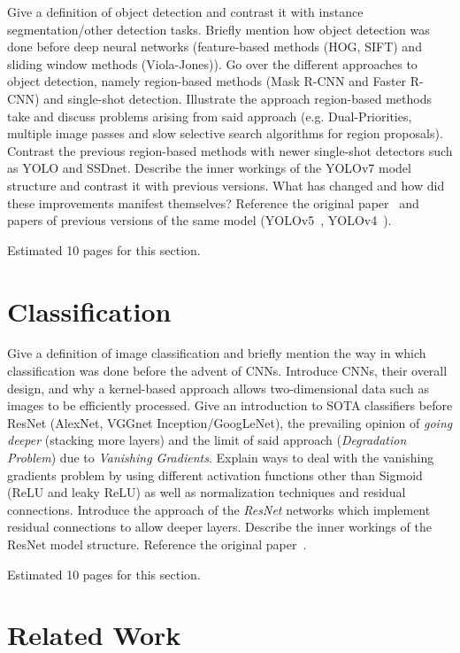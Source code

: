 \documentclass[draft,final]{vutinfth} %
\begin{document}
Give a definition of object detection and contrast it with instance
segmentation/other detection tasks. Briefly mention how object
detection was done before deep neural networks (feature-based methods
(HOG, SIFT) and sliding window methods (Viola-Jones)). Go over the
different approaches to object detection, namely region-based methods
(Mask R-CNN and Faster R-CNN) and single-shot detection. Illustrate
the approach region-based methods take and discuss problems arising
from said approach (e.g. Dual-Priorities, multiple image passes and
slow selective search algorithms for region proposals). Contrast the
previous region-based methods with newer single-shot detectors such as
YOLO and SSDnet. Describe the inner workings of the YOLOv7 model
structure and contrast it with previous versions. What has changed and
how did these improvements manifest themselves? Reference the original
paper~\cite{wang2022} and papers of previous versions of the same
model (YOLOv5~\cite{jocher2022}, YOLOv4~\cite{bochkovskiy2020}).

Estimated 10 pages for this section.

\section{Classification}
\label{sec:background-classification}

Give a definition of image classification and briefly mention the way
in which classification was done before the advent of CNNs. Introduce
CNNs, their overall design, and why a kernel-based approach allows
two-dimensional data such as images to be efficiently processed. Give
an introduction to SOTA classifiers before ResNet (AlexNet, VGGnet
Inception/GoogLeNet), the prevailing opinion of \emph{going deeper}
(stacking more layers) and the limit of said approach
(\emph{Degradation Problem}) due to \emph{Vanishing
Gradients}. Explain ways to deal with the vanishing gradients problem
by using different activation functions other than Sigmoid (ReLU and
leaky ReLU) as well as normalization techniques and residual
connections. Introduce the approach of the \emph{ResNet} networks
which implement residual connections to allow deeper layers. Describe
the inner workings of the ResNet model structure. Reference the
original paper~\cite{he2016}.

Estimated 10 pages for this section.

\section{Related Work}
\label{sec:related-work}
\end{document}
